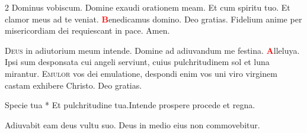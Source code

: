 \begin{multicols}{2}
\newline {} Dominus vobiscum.  Domine exaudi orationem meam.
\newline \R Et cum spiritu tuo.  Et clamor meus ad te veniat.
\newline \textcolor{Red}{\bfseries B}enedicamus domino. \R Deo gratias.
\newline {}
\newline Fidelium anime per misericordiam dei requiescant in pace. \R Amen.
\newline {}


\vspace{+1em}
\newline {}
\newline {}
\newline {}
\lettrine[lines=2]{\zallmancaps \color{Red} D}{eus} in adiutorium meum intende. \R Domine ad adiuvandum me festina. 
\newline \doxology \textcolor{Red}{\bfseries A}lleluya.
\newline {}
\newline {} Ipsi sum desponsata cui angeli serviunt, cuius pulchritudinem sol et luna mirantur.
\newline {}
\lettrine[lines=2]{\zallmancaps \color{Red} E}{mulor} vos dei emulatione, despondi enim vos uni viro virginem castam exhibere Christo. \R Deo gratias.
\begin{responsory-breve-full}
{Specie tua * Et pulchritudine tua.}{Intende prospere procede et regna.}
\end{responsory-breve-full}%
\newline \V Adiuvabit eam deus vultu suo. \R Deus in medio eius non commovebitur.

\end{multicols}
